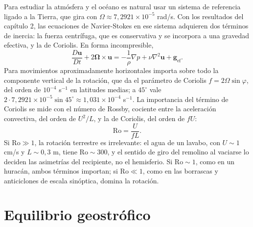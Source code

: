 \documentclass[10pt,openany]{book}
\begin{document}
Para estudiar la atmósfera y el océano es natural usar un sistema de referencia ligado a la Tierra, que gira con \(\Omega \approx 7{,}2921\times 10^{-5}\) rad/s. Con los resultados del capítulo 2, las ecuaciones de Navier-Stokes en ese sistema adquieren dos términos de inercia: la fuerza centrífuga, que es conservativa y se incorpora a una gravedad efectiva, y la de Coriolis. En forma incompresible,
\begin{equation}
\frac{D\mathbf{u}}{Dt} + 2\boldsymbol{\Omega}\times\mathbf{u} = -\frac{1}{\rho}\nabla p + \nu\nabla^{2}\mathbf{u} + \mathbf{g}_{\mathrm{ef}}. \label{eq:c16-rotacion}
\end{equation}
Para movimientos aproximadamente horizontales importa sobre todo la componente vertical de la rotación, que da el parámetro de Coriolis \(f = 2\Omega\sin\varphi\), del orden de \(10^{-4}\) s\(^{-1}\) en latitudes medias; a \(45^\circ\) vale \(2\cdot 7{,}2921\times 10^{-5}\sin 45^\circ \approx 1{,}031\times 10^{-4}\) s\(^{-1}\). La importancia del término de Coriolis se mide con el número de Rossby, cociente entre la aceleración convectiva, del orden de \(U^{2}/L\), y la de Coriolis, del orden de \(fU\):
\begin{equation}
\mathrm{Ro} = \frac{U}{f L}. \label{eq:c16-rossby}
\end{equation}
Si \(\mathrm{Ro} \gg 1\), la rotación terrestre es irrelevante: el agua de un lavabo, con \(U \sim 1\) cm/s y \(L \sim 0{,}3\) m, tiene \(\mathrm{Ro} \sim 300\), y el sentido de giro del remolino al vaciarse lo deciden las asimetrías del recipiente, no el hemisferio. Si \(\mathrm{Ro} \sim 1\), como en un huracán, ambos términos importan; si \(\mathrm{Ro} \ll 1\), como en las borrascas y anticiclones de escala sinóptica, domina la rotación.

\section{Equilibrio geostrófico}
\end{document}
